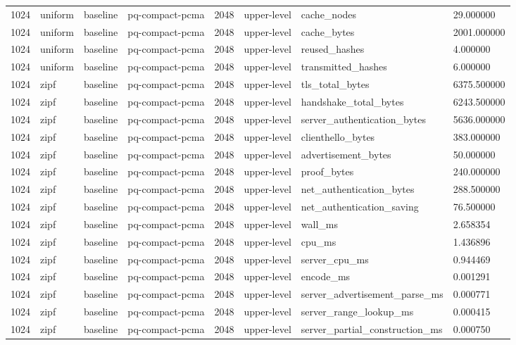 \begin{tabular}{llllllll}
1024 & uniform & baseline & pq-compact-pcma & 2048 & upper-level & cache\_nodes & 29.000000 \\
1024 & uniform & baseline & pq-compact-pcma & 2048 & upper-level & cache\_bytes & 2001.000000 \\
1024 & uniform & baseline & pq-compact-pcma & 2048 & upper-level & reused\_hashes & 4.000000 \\
1024 & uniform & baseline & pq-compact-pcma & 2048 & upper-level & transmitted\_hashes & 6.000000 \\
1024 & zipf & baseline & pq-compact-pcma & 2048 & upper-level & tls\_total\_bytes & 6375.500000 \\
1024 & zipf & baseline & pq-compact-pcma & 2048 & upper-level & handshake\_total\_bytes & 6243.500000 \\
1024 & zipf & baseline & pq-compact-pcma & 2048 & upper-level & server\_authentication\_bytes & 5636.000000 \\
1024 & zipf & baseline & pq-compact-pcma & 2048 & upper-level & clienthello\_bytes & 383.000000 \\
1024 & zipf & baseline & pq-compact-pcma & 2048 & upper-level & advertisement\_bytes & 50.000000 \\
1024 & zipf & baseline & pq-compact-pcma & 2048 & upper-level & proof\_bytes & 240.000000 \\
1024 & zipf & baseline & pq-compact-pcma & 2048 & upper-level & net\_authentication\_bytes & 288.500000 \\
1024 & zipf & baseline & pq-compact-pcma & 2048 & upper-level & net\_authentication\_saving & 76.500000 \\
1024 & zipf & baseline & pq-compact-pcma & 2048 & upper-level & wall\_ms & 2.658354 \\
1024 & zipf & baseline & pq-compact-pcma & 2048 & upper-level & cpu\_ms & 1.436896 \\
1024 & zipf & baseline & pq-compact-pcma & 2048 & upper-level & server\_cpu\_ms & 0.944469 \\
1024 & zipf & baseline & pq-compact-pcma & 2048 & upper-level & encode\_ms & 0.001291 \\
1024 & zipf & baseline & pq-compact-pcma & 2048 & upper-level & server\_advertisement\_parse\_ms & 0.000771 \\
1024 & zipf & baseline & pq-compact-pcma & 2048 & upper-level & server\_range\_lookup\_ms & 0.000415 \\
1024 & zipf & baseline & pq-compact-pcma & 2048 & upper-level & server\_partial\_construction\_ms & 0.000750 \\

\end{tabular}
